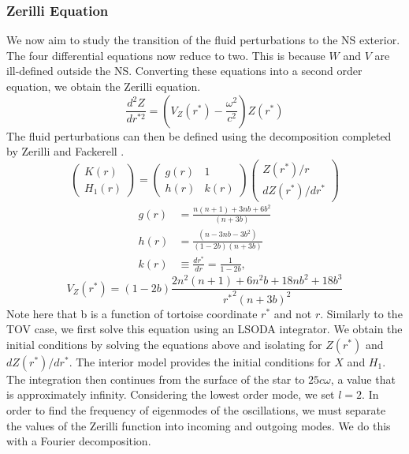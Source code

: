 \documentclass[aps,prd,twocolumn,superscriptaddress,footinbib]{revtex4-1}
\begin{document}
\subsubsection{Zerilli Equation}
We now aim to study the transition of the fluid perturbations to the NS exterior. The four differential equations now reduce to two. This is because $W$ and $V$ are ill-defined outside the NS. Converting these equations into a second order equation, we obtain the Zerilli equation.  
\begin{equation}
\frac{d^{2} Z}{d r^{* 2}}=\left(V_{Z}(r^*)-\frac{\omega^{2}}{c^2}\right) Z(r^*)
\end{equation}
The fluid perturbations can then be defined using the decomposition completed by Zerilli and Fackerell \cite{1971}. 
\begin{equation}
\left(\begin{array}{c}
K(r) \\
H_{1}(r)
\end{array}\right)=\left(\begin{array}{lc}
g(r) & 1 \\
h(r) & k(r)
\end{array}\right)\left(\begin{array}{c}
Z\left(r^{*}\right) / r \\
d Z\left(r^{*}\right) / d r^{*}
\end{array}\right)
\end{equation}
\begin{equation}
\begin{aligned}
g(r) &=\frac{n(n+1)+3 n b+6 b^{2}}{(n+3 b)} \\
h(r) &=\frac{\left(n-3 n b-3 b^{2}\right)}{(1-2 b)(n+3 b)} \\
k(r) & \equiv \frac{d r^{*}}{d r}=\frac{1}{1-2 b},
\end{aligned}
\end{equation}
\begin{equation}
V_{Z}(r^*)=(1-2 b) \frac{2 n^{2}(n+1)+6 n^{2} b+18 n b^{2}+18 b^{3}}{{r^*}^{2}(n+3 b)^{2}}
\end{equation}
Note here that b is a function of tortoise coordinate $r^*$ and not $r$. Similarly to the TOV case, we first solve this equation using an LSODA integrator. We obtain the initial conditions by solving the equations above and isolating for $Z(r^*)$ and $dZ(r^*)/dr^*$. The interior model provides the initial conditions for $X$ and $H_1$. The integration then continues from the surface of the star to $25c\omega$, a value that is approximately infinity. Considering the lowest order mode, we set $l = 2$. In order to find the frequency of eigenmodes of the oscillations, we must separate the values of the Zerilli function into incoming and outgoing modes. We do this with a Fourier decomposition.
\end{document}
